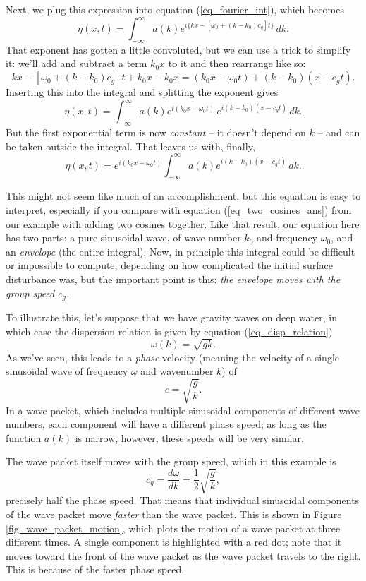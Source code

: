Next, we plug this expression into equation (\ref{eq_fourier_int}), which becomes
\[
\eta (x, t) = \int_{-\infty}^\infty a(k) e^{i\big\{ kx - [\omega_0 + (k - k_0) c_g ] t \big\}} \, dk.
\]
That exponent has gotten a little convoluted, but we can use a trick to simplify it: we'll add and subtract a term $k_0 x$ to it and then rearrange like so:
\[
kx - [\omega_0 + (k - k_0) c_g ] t + k_0 x - k_0 x = (k_0 x - \omega_0 t) + (k - k_0)(x - c_g t).
\]
Inserting this into the integral and splitting the exponent gives
\[
\eta (x, t) = \int_{-\infty}^\infty a(k) e^{i(k_0 x - \omega_0 t)} \, e^{i(k - k_0) (x - c_g t)} \, dk.
\]
But the first exponential term is now \emph{constant} -- it doesn't depend on $k$ -- and can be taken outside the integral.  That leaves us with, finally,
\begin{equation}
\eta (x, t) =  e^{i(k_0 x - \omega_0 t)} \int_{-\infty}^\infty a(k) e^{i(k - k_0) (x - c_g t)} \, dk.
\end{equation}

This might not seem like much of an accomplishment, but this equation is easy to interpret, especially if you compare with equation (\ref{eq_two_cosines_ans}) from our example with adding two cosines together.  Like that result, our equation here has two parts:  a pure sinusoidal wave, of wave number $k_0$ and frequency $\omega_0$, and an \emph{envelope} (the entire integral).  Now, in principle this integral could be difficult or impossible to compute, depending on how complicated the initial surface disturbance was, but the important point is this: \emph{the envelope moves with the group speed $c_g$.}

\begin{example}
To illustrate this, let's suppose that we have gravity waves on deep water, in which case the dispersion relation is given by equation (\ref{eq_disp_relation})
\[
\omega(k) = \sqrt{gk}.
\]
As we've seen, this leads to a \emph{phase} velocity (meaning the velocity of a single sinusoidal wave of frequency $\omega$ and wavenumber $k$) of
\[
c = \sqrt{\frac{g}{k}}.
\]
In a wave packet, which includes multiple sinusoidal components of different wave numbers, each component will have a different phase speed; as long as the function $a(k)$ is narrow, however, these speeds will be very similar.

The wave packet itself moves with the group speed, which in this example is
\[
c_g = \frac{d\omega}{dk} = \frac{1}{2} \sqrt{\frac{g}{k} },
\]
precisely half the phase speed.  That means that individual sinusoidal components of the wave packet move \emph{faster} than the wave packet.  This is shown in Figure \ref{fig_wave_packet_motion}, which plots the motion of a wave packet at three different times.  A single component is highlighted with a red dot; note that it moves toward the front of the wave packet as the wave packet travels to the right.  This is because of the faster phase speed.
\end{example}

